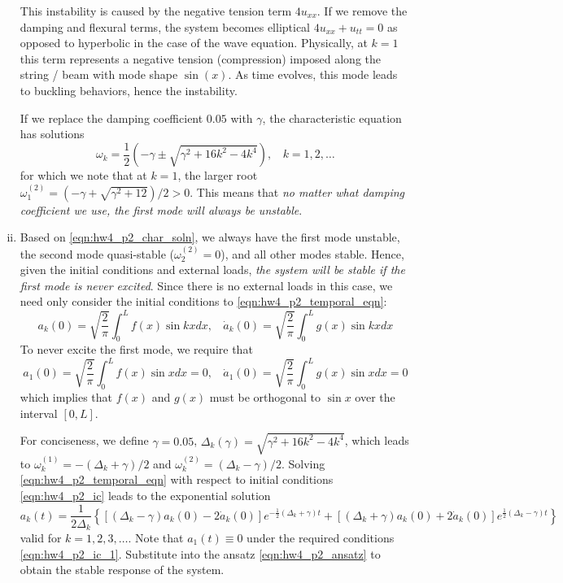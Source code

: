 \begin{enumerate}[(i)]
{    This instability is caused by the negative tension term $4u_{xx}$. 
    If we remove the damping and flexural terms, the system becomes elliptical $4u_{xx} + u_{tt} = 0$ as opposed to hyperbolic in the case of the wave equation. 
    Physically, at $k = 1$ this term represents a negative tension (compression) imposed along the string / beam with mode shape $\sin(x)$.
    As time evolves, this mode leads to buckling behaviors, hence the instability.
 
    If we replace the damping coefficient $0.05$ with $\gamma$, the characteristic equation has solutions 
    \begin{equation}\label{eqn:hw4_p2_char_soln}
        \omega_k = \frac{1}{2}\left(-\gamma \pm \sqrt{\gamma^2 + 16k^2 - 4k^4} \right), ~~~~ k = 1, 2, \ldots
    \end{equation}
    for which we note that at $k = 1$, the larger root $\omega_1^{(2)} = (-\gamma + \sqrt{\gamma^2+12})/2 > 0$.
    This means that \emph{no matter what damping coefficient we use, the first mode will always be unstable}.
} 
\item { %
    Based on \cref{eqn:hw4_p2_char_soln}, we always have the first mode unstable, the second mode quasi-stable ($\omega_2^{(2)} = 0$), and all other modes stable. 
    Hence, given the initial conditions and external loads, \emph{the system will be stable if the first mode is never excited}. 
    Since there is no external loads in this case, we need only consider the initial conditions to \cref{eqn:hw4_p2_temporal_eqn}: 
    \begin{equation} \label{eqn:hw4_p2_ic}
        a_k(0) = \sqrt{\frac{2}{\pi}} \int_0^L f(x) \sin kx dx, ~~~~ \dot{a}_k(0) = \sqrt{\frac{2}{\pi}} \int_0^L g(x) \sin kx dx
    \end{equation}
    To never excite the first mode, we require that 
    \begin{equation}\label{eqn:hw4_p2_ic_1}
        \boxed{a_1(0) = \sqrt{\frac{2}{\pi}} \int_0^L f(x) \sin x dx = 0, ~~~~ \dot{a}_1(0) = \sqrt{\frac{2}{\pi}} \int_0^L g(x) \sin x dx = 0}
    \end{equation}
    which implies that $f(x)$ and $g(x)$ must be orthogonal to $\sin x$ over the interval $[0, L]$.

    For conciseness, we define $\gamma = 0.05$, $\Delta_k(\gamma) = \sqrt{\gamma^2 + 16k^2 - 4k^4}$, which leads to $\omega_k^{(1)} = -(\Delta_k+\gamma)/2$ and $\omega_k^{(2)} = (\Delta_k-\gamma)/2$. 
    Solving \cref{eqn:hw4_p2_temporal_eqn} with respect to initial conditions \cref{eqn:hw4_p2_ic} leads to the exponential solution 
    \begin{equation}
        a_k(t) = \frac{1}{2\Delta_k}\left\{\left[(\Delta_k - \gamma) a_k(0) - 2\dot{a}_k(0) \right]e^{-\frac{1}{2}(\Delta_k+\gamma)t} + \left[(\Delta_k + \gamma) a_k(0) + 2\dot{a}_k(0) \right]e^{\frac{1}{2}(\Delta_k-\gamma)t} \right\}
    \end{equation}
    valid for $k = 1, 2, 3, \ldots$. 
    Note that $a_1(t) \equiv 0$ under the required conditions \cref{eqn:hw4_p2_ic_1}. 
    Substitute into the ansatz \cref{eqn:hw4_p2_ansatz} to obtain the stable response of the system.
}
\end{enumerate}

